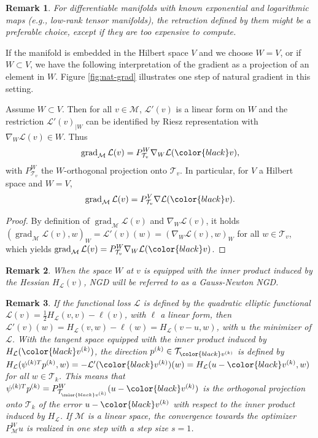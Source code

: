 \documentclass{article}
\theoremstyle{noparens}
\newtheorem{remark}{Remark}[section]
\newcommand{\cL}{\mathcal{L}}
\newcommand{\cT}{\mathcal{T}}
\newcommand{\cM}{\mathcal{M}}
\newcommand{\colorM}{\color{black}}
\renewcommand{\v}{{\colorM v}}
\newcommand{\vk}{{\colorM v^{(k)}}}
\newcommand{\psikT}{\psi^{(k)T}}
\newcommand{\gradM}{\operatorname{grad}_{\cM}}
\begin{document}
\begin{remark}
For differentiable manifolds with known
exponential and logarithmic maps (e.g., low-rank tensor manifolds), the retraction defined by them might be a preferable choice, except if they are   too expensive to compute.
\end{remark}


If the manifold is embedded in the  Hilbert space $V$ and we choose $W=V$, or if $W \subset V$, we have the following interpretation of the gradient as a projection of an element in $W$. Figure \ref{fig:nat-grad} illustrates one step of natural gradient in this setting.
\begin{lemma}
\label{lem:projection}
Assume $W\subset V$. Then for all $v\in \cM$, $\cL'(v)$ is  a linear form on $W$ and the restriction $\cL'(v)_{\vert W}$ can be identified by Riesz representation with $\nabla _W \cL(v) \in W$. Thus
$$
\gradM \cL(v) = P^W_{\cT_{v}} \nabla_W \cL(\v),
$$
with $ P^W_{\cT_{v}} $ the $W$-orthogonal projection onto $\cT_v.$ 
In particular, for $V$ a Hilbert space and $W=V$, $$\gradM \cL(v) = P^V_{\cT_{v}} \nabla \cL(\v).$$
\end{lemma}
\begin{proof}
By definition of  $\gradM \cL(v)$ and  $\nabla_W \cL(v)$, it holds
$(\gradM \cL(v) , w)_W = \cL'(v)(w) = (\nabla_W \cL(v) , w)_W$ for all $w \in \cT_v$, which  yields $\gradM \cL(v) = P^W_{\cT_v} \nabla_W \cL(\v)$.
\end{proof}


\begin{remark}
When the space $W$ at $v$ is equipped with the inner product induced by the Hessian  $H_\cL(v)$, NGD will be referred to as a Gauss-Newton NGD.
\end{remark}


\begin{remark}
\label{rmk:one-step-convergence}
    If the functional loss $\cL$ is defined by the quadratic elliptic functional $\cL(v) = \frac 1 2 H_\cL(v, v) - \ell(v)$, with $\ell$ a linear form, then $\cL'(v)(w)=H_\cL(v, w) - \ell(w) = H_\cL(v-u, w)$, with $u$ the minimizer of $\cL$. With the tangent space equipped with the inner product induced by $H_\cL(\vk)$, the direction $p^{(k)} \in \cT_\vk$ is defined by $H_\cL(\psikT p^{(k)} , w) =  - \cL'(\vk)(w)  = H_\cL(u-\vk, w)  $ for all $w\in \cT_k$. This means that $\psikT p^{(k)} = P^W_{\cT_\vk} (u-\vk)$ is the orthogonal projection onto $\cT_k$ of the error $u-\vk$ with respect to the inner product induced by $H_\cL$.
    If $\cM$ is a linear space,  the convergence towards the optimizer $P^W_{\cM} u$ is  realized in one step with a step size $s=1$.
\end{remark}
\end{document}
